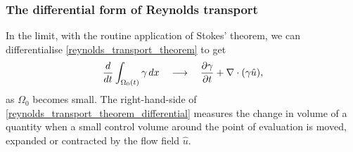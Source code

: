 \subsubsection{The differential form of Reynolds transport}
 In the limit, with the routine application of Stokes' theorem, we can differentialise \eqref{reynolds_transport_theorem}
to get
\begin{equation}\label{reynolds_transport_theorem_differential}
    \frac{d}{dt}\int_{\Omega_0(t)}\gamma\,dx \quad\longrightarrow\quad \frac{\partial \gamma}{\partial t} + \nabla \cdot(\gamma \hat{u}),
\end{equation}
as $\Omega_0$ becomes small.
The right-hand-side of \eqref{reynolds_transport_theorem_differential} measures
the change in volume of a quantity when a small control volume around the point of evaluation is moved, expanded or contracted by the flow field $\hat{u}$.

